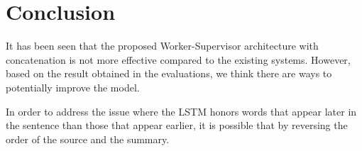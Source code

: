 \documentclass[letterpaper]{article} %
\begin{document}
\section{Conclusion}
It has been seen that the proposed Worker-Supervisor architecture with concatenation is not more effective compared to the existing systems. However, based on the result obtained in the evaluations, we think there are ways to potentially improve the model.

In order to address the issue where the LSTM honors words that appear later in the sentence than those that appear earlier, it is possible that by reversing the order of the source and the summary.



\end{document}
